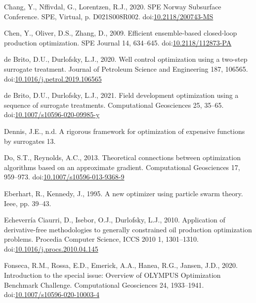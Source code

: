\documentclass[]{elsarticle} %
\newlength{\cslhangindent}
\newenvironment{CSLReferences}[2] %
 {%
  \setlength{\parindent}{0pt}
  \ifodd #1 \everypar{\setlength{\hangindent}{\cslhangindent}}\ignorespaces\fi
  \ifnum #2 > 0
  \setlength{\parskip}{#2\baselineskip}
  \fi
 }%
 {}
\begin{document}
\begin{eqution}
\begin{CSLReferences}{1}{0}
\leavevmode{}%
Chang, Y., Nffivdal, G., Lorentzen, R.J., 2020. SPE Norway Subsurface Conference. SPE, Virtual, p. D021S008R002. doi:\href{https://doi.org/10.2118/200743-MS}{10.2118/200743-MS}

\leavevmode{}%
Chen, Y., Oliver, D.S., Zhang, D., 2009. Efficient ensemble-based closed-loop production optimization. SPE Journal 14, 634--645. doi:\href{https://doi.org/10.2118/112873-PA}{10.2118/112873-PA}

\leavevmode{}%
de Brito, D.U., Durlofsky, L.J., 2020. Well control optimization using a two-step surrogate treatment. Journal of Petroleum Science and Engineering 187, 106565. doi:\href{https://doi.org/10.1016/j.petrol.2019.106565}{10.1016/j.petrol.2019.106565}

\leavevmode{}%
de Brito, D.U., Durlofsky, L.J., 2021. Field development optimization using a sequence of surrogate treatments. Computational Geosciences 25, 35--65. doi:\href{https://doi.org/10.1007/s10596-020-09985-y}{10.1007/s10596-020-09985-y}

\leavevmode{}%
Dennis, J.E., n.d. A rigorous framework for optimization of expensive functions by surrogates 13.

\leavevmode{}%
Do, S.T., Reynolds, A.C., 2013. Theoretical connections between optimization algorithms based on an approximate gradient. Computational Geosciences 17, 959--973. doi:\href{https://doi.org/10.1007/s10596-013-9368-9}{10.1007/s10596-013-9368-9}

\leavevmode{}%
Eberhart, R., Kennedy, J., 1995. A new optimizer using particle swarm theory. Ieee, pp. 39--43.

\leavevmode{}%
Echeverría Ciaurri, D., Isebor, O.J., Durlofsky, L.J., 2010. Application of derivative-free methodologies to generally constrained oil production optimization problems. Procedia Computer Science, ICCS 2010 1, 1301--1310. doi:\href{https://doi.org/10.1016/j.procs.2010.04.145}{10.1016/j.procs.2010.04.145}

\leavevmode{}%
Fonseca, R.M., Rossa, E.D., Emerick, A.A., Hanea, R.G., Jansen, J.D., 2020. Introduction to the special issue: Overview of OLYMPUS Optimization Benchmark Challenge. Computational Geosciences 24, 1933--1941. doi:\href{https://doi.org/10.1007/s10596-020-10003-4}{10.1007/s10596-020-10003-4}


\end{CSLReferences}
\end{eqution}
\end{document}
